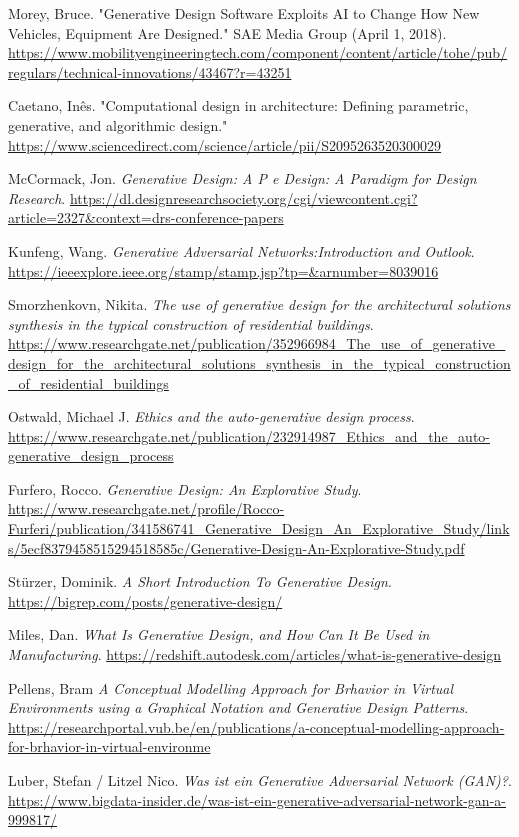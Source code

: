 \begin{thebibliography}{99}
    
     Morey, Bruce. "Generative Design Software Exploits AI to Change How New Vehicles, Equipment Are Designed." SAE Media Group (April 1, 2018). \url{https://www.mobilityengineeringtech.com/component/content/article/tohe/pub/regulars/technical-innovations/43467?r=43251}

      Caetano, Inês. "Computational design in architecture: Defining parametric, generative, and algorithmic design." \url{https://www.sciencedirect.com/science/article/pii/S2095263520300029}
        
     McCormack, Jon. \textit{Generative Design: A P e Design: A Paradigm for Design Research}. \url{https://dl.designresearchsociety.org/cgi/viewcontent.cgi?article=2327&context=drs-conference-papers}

     Kunfeng, Wang. \textit{Generative Adversarial Networks:Introduction and Outlook}. \url{https://ieeexplore.ieee.org/stamp/stamp.jsp?tp=&arnumber=8039016}

     Smorzhenkovn, Nikita. \textit{The use of generative design for the architectural solutions synthesis in the typical construction of residential buildings}. \url{https://www.researchgate.net/publication/352966984_The_use_of_generative_design_for_the_architectural_solutions_synthesis_in_the_typical_construction_of_residential_buildings}

     Ostwald, Michael J. \textit{Ethics and the auto-generative design process}. \url{https://www.researchgate.net/publication/232914987_Ethics_and_the_auto-generative_design_process}

     Furfero, Rocco. \textit{Generative Design: An Explorative Study}. \url{https://www.researchgate.net/profile/Rocco-Furferi/publication/341586741_Generative_Design_An_Explorative_Study/links/5ecf8379458515294518585c/Generative-Design-An-Explorative-Study.pdf}

     Stürzer, Dominik. \textit{A Short Introduction To Generative Design}. \url{https://bigrep.com/posts/generative-design/}

     Miles, Dan. \textit{What Is Generative Design, and How Can It Be Used in Manufacturing}. \url{https://redshift.autodesk.com/articles/what-is-generative-design}
    
     Pellens, Bram \textit{A Conceptual Modelling Approach for Brhavior in Virtual Environments using a Graphical Notation and Generative Design Patterns}. \url{https://researchportal.vub.be/en/publications/a-conceptual-modelling-approach-for-brhavior-in-virtual-environme}

     Luber, Stefan / Litzel Nico. \textit{Was ist ein Generative Adversarial Network (GAN)?}. \url{https://www.bigdata-insider.de/was-ist-ein-generative-adversarial-network-gan-a-999817/}

\end{thebibliography}